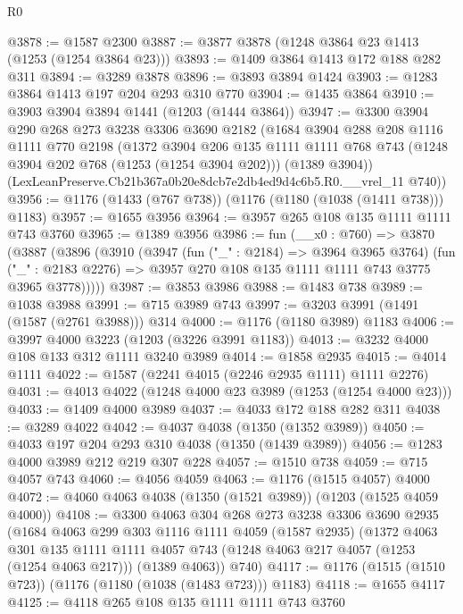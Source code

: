 \begin{lexlean}{R0}
\begin{coremodule}
@3878 := @1587 @2300
@3887 := @3877 @3878 (@1248 @3864 @23 @1413 (@1253 (@1254 @3864 @23)))
@3893 := @1409 @3864 @1413 @172 @188 @282 @311
@3894 := @3289 @3878
@3896 := @3893 @3894 @1424
@3903 := @1283 @3864 @1413 @197 @204 @293 @310 @770
@3904 := @1435 @3864
@3910 := @3903 @3904 @3894 @1441 (@1203 (@1444 @3864))
@3947 := @3300
    @3904
    @290
    @268
    @273
    @3238
    @3306
    @3690
    @2182
    (@1684
      @3904
      @288
      @208
      @1116
      @1111
      @770
      @2198
      (@1372
        @3904
        @206
        @135
        @1111
        @1111
        @768
        @743
        (@1248 @3904 @202 @768 (@1253 (@1254 @3904 @202)))
        (@1389 @3904))
      (LexLeanPreserve.Cb21b367a0b20e8dcb7e2db4ed9d4c6b5.R0.__vrel_11 @740))
@3956 := @1176 (@1433 (@767 @738)) (@1176 (@1180 (@1038 (@1411 @738))) @1183)
@3957 := @1655 @3956
@3964 := @3957 @265 @108 @135 @1111 @1111 @743 @3760
@3965 := @1389 @3956
@3986 := fun (__x0 : @760) =>
  @3870
    (@3887
      (@3896
        (@3910
          (@3947
            (fun ("_" : @2184) => @3964 @3965 @3764)
            (fun ("_" : @2183 @2276) => @3957 @270 @108 @135 @1111 @1111 @743 @3775 @3965 @3778)))))
@3987 := @3853 @3986
@3988 := @1483 @738
@3989 := @1038 @3988
@3991 := @715 @3989 @743
@3997 := @3203 @3991 (@1491 (@1587 (@2761 @3988))) @314
@4000 := @1176 (@1180 @3989) @1183
@4006 := @3997 @4000 @3223 (@1203 (@3226 @3991 @1183))
@4013 := @3232 @4000 @108 @133 @312 @1111 @3240 @3989
@4014 := @1858 @2935
@4015 := @4014 @1111
@4022 := @1587 (@2241 @4015 (@2246 @2935 @1111) @1111 @2276)
@4031 := @4013 @4022 (@1248 @4000 @23 @3989 (@1253 (@1254 @4000 @23)))
@4033 := @1409 @4000 @3989
@4037 := @4033 @172 @188 @282 @311
@4038 := @3289 @4022
@4042 := @4037 @4038 (@1350 (@1352 @3989))
@4050 := @4033 @197 @204 @293 @310 @4038 (@1350 (@1439 @3989))
@4056 := @1283 @4000 @3989 @212 @219 @307 @228
@4057 := @1510 @738
@4059 := @715 @4057 @743
@4060 := @4056 @4059
@4063 := @1176 (@1515 @4057) @4000
@4072 := @4060 @4063 @4038 (@1350 (@1521 @3989)) (@1203 (@1525 @4059 @4000))
@4108 := @3300
    @4063
    @304
    @268
    @273
    @3238
    @3306
    @3690
    @2935
    (@1684
      @4063
      @299
      @303
      @1116
      @1111
      @4059
      (@1587 @2935)
      (@1372
        @4063
        @301
        @135
        @1111
        @1111
        @4057
        @743
        (@1248 @4063 @217 @4057 (@1253 (@1254 @4063 @217)))
        (@1389 @4063))
      @740)
@4117 := @1176 (@1515 (@1510 @723)) (@1176 (@1180 (@1038 (@1483 @723))) @1183)
@4118 := @1655 @4117
@4125 := @4118 @265 @108 @135 @1111 @1111 @743 @3760

\end{coremodule}
\end{lexlean}
